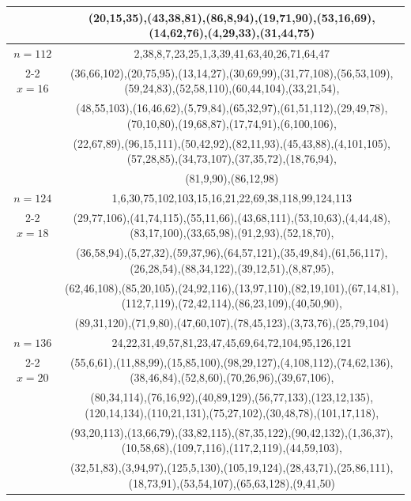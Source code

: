 \begin{tabular}{| c | c |}
&(20,15,35),(43,38,81),(86,8,94),(19,71,90),(53,16,69),(14,62,76),(4,29,33),(31,44,75)\\
\hline 
\(n=112\) & 
2,38,8,7,23,25,1,3,39,41,63,40,26,71,64,47\\
\cline{2-2}
\(x=16\)
&(36,66,102),(20,75,95),(13,14,27),(30,69,99),(31,77,108),(56,53,109),(59,24,83),(52,58,110),(60,44,104),(33,21,54),\\
&(48,55,103),(16,46,62),(5,79,84),(65,32,97),(61,51,112),(29,49,78),(70,10,80),(19,68,87),(17,74,91),(6,100,106),\\
&(22,67,89),(96,15,111),(50,42,92),(82,11,93),(45,43,88),(4,101,105),(57,28,85),(34,73,107),(37,35,72),(18,76,94),\\
&(81,9,90),(86,12,98)\\
\hline 
\(n=124\) & 
1,6,30,75,102,103,15,16,21,22,69,38,118,99,124,113\\
\cline{2-2}
\(x=18\)
&(29,77,106),(41,74,115),(55,11,66),(43,68,111),(53,10,63),(4,44,48),(83,17,100),(33,65,98),(91,2,93),(52,18,70),\\
&(36,58,94),(5,27,32),(59,37,96),(64,57,121),(35,49,84),(61,56,117),(26,28,54),(88,34,122),(39,12,51),(8,87,95),\\
&(62,46,108),(85,20,105),(24,92,116),(13,97,110),(82,19,101),(67,14,81),(112,7,119),(72,42,114),(86,23,109),(40,50,90),\\
&(89,31,120),(71,9,80),(47,60,107),(78,45,123),(3,73,76),(25,79,104)\\
\hline 
\(n=136\) & 
24,22,31,49,57,81,23,47,45,69,64,72,104,95,126,121\\
\cline{2-2}
\(x=20\)
&(55,6,61),(11,88,99),(15,85,100),(98,29,127),(4,108,112),(74,62,136),(38,46,84),(52,8,60),(70,26,96),(39,67,106),\\
&(80,34,114),(76,16,92),(40,89,129),(56,77,133),(123,12,135),(120,14,134),(110,21,131),(75,27,102),(30,48,78),(101,17,118),\\
&(93,20,113),(13,66,79),(33,82,115),(87,35,122),(90,42,132),(1,36,37),(10,58,68),(109,7,116),(117,2,119),(44,59,103),\\
&(32,51,83),(3,94,97),(125,5,130),(105,19,124),(28,43,71),(25,86,111),(18,73,91),(53,54,107),(65,63,128),(9,41,50)\\
\hline 
\end{tabular}